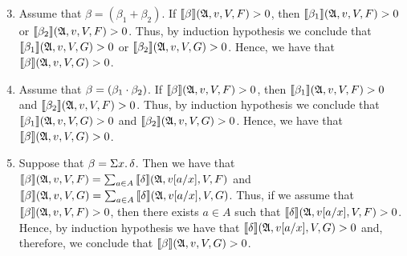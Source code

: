 \begin{enumerate}
\setcounter{enumi}{2}
\item Assume that $\beta = (\beta_1 + \beta_2)$. If $\sem{\beta}(\A,v,V,F) > 0$, then 
$\sem{\beta_1}(\A,v,V,F) > 0$ or $\sem{\beta_2}(\A,v,V,F) > 0$. Thus, by induction hypothesis we conclude that $\sem{\beta_1}(\A,v,V,G) > 0$ or $\sem{\beta_2}(\A,v,V,G) > 0$. Hence, we have that $\sem{\beta}(\A,v,V,G) > 0$.

\item Assume that $\beta = (\beta_1 \mult \beta_2)$. If $\sem{\beta}(\A,v,V,F) > 0$, then 
$\sem{\beta_1}(\A,v,V,F) > 0$ and $\sem{\beta_2}(\A,v,V,F) > 0$. Thus, by induction hypothesis we conclude that $\sem{\beta_1}(\A,v,V,G) > 0$ and $\sem{\beta_2}(\A,v,V,G) > 0$. Hence, we have that $\sem{\beta}(\A,v,V,G) > 0$.


\item Suppose that $\beta = \sa{x} \delta$. Then we have that $\sem{\beta}(\A,v,V,F) = \sum_{a \in A} \sem{\delta}(\A,v[a/x],V,F)$ and $\sem{\beta}(\A,v,V,G) = \sum_{a \in A} \sem{\delta}(\A,v[a/x],V,G)$. Thus, if we assume that $\sem{\beta}(\A,v,V,F) > 0$, then there exists $a \in A$ such that $\sem{\delta}(\A,v[a/x],V,F) > 0$. Hence, by induction hypothesis we have that $\sem{\delta}(\A,v[a/x],V,G) > 0$ and, therefore, we conclude that $\sem{\beta}(\A,v,V,G) >0$.




\end{enumerate}
